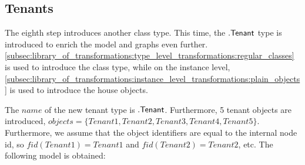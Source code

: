 \subsection{Tenants}
\label{sec:application:building_the_model:tenants}

The eighth step introduces another class type. This time, the $.\mathsf{Tenant}$ type is introduced to enrich the model and graphs even further. \cref{subsec:library_of_transformations:type_level_transformations:regular_classes} is used to introduce the class type, while on the instance level, \cref{subsec:library_of_transformations:instance_level_transformations:plain_objects} is used to introduce the house objects.

The $name$ of the new tenant type is $.\mathsf{Tenant}$. Furthermore, 5 tenant objects are introduced, $objects = \{Tenant1, Tenant2, Tenant3, Tenant4, Tenant5\}$. Furthermore, we assume that the object identifiers are equal to the internal node id, so $fid(Tenant1) = Tenant1$ and $fid(Tenant2) = Tenant2$, etc. The following model is obtained:


